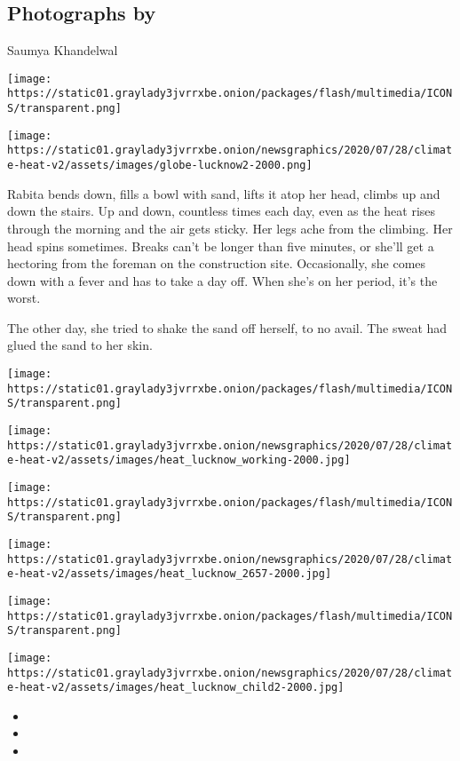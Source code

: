 \hypertarget{photographs-by-4}{%
\subsection{Photographs by}\label{photographs-by-4}}

Saumya Khandelwal

\texttt{[image: https://static01.graylady3jvrrxbe.onion/packages/flash/multimedia/ICONS/transparent.png]}

\texttt{[image: https://static01.graylady3jvrrxbe.onion/newsgraphics/2020/07/28/climate-heat-v2/assets/images/globe-lucknow2-2000.png]}

Rabita bends down, fills a bowl with sand, lifts it atop her head,
climbs up and down the stairs. Up and down, countless times each day,
even as the heat rises through the morning and the air gets sticky. Her
legs ache from the climbing. Her head spins sometimes. Breaks can't be
longer than five minutes, or she'll get a hectoring from the foreman on
the construction site. Occasionally, she comes down with a fever and has
to take a day off. When she's on her period, it's the worst.

The other day, she tried to shake the sand off herself, to no avail. The
sweat had glued the sand to her skin.

\texttt{[image: https://static01.graylady3jvrrxbe.onion/packages/flash/multimedia/ICONS/transparent.png]}

\texttt{[image: https://static01.graylady3jvrrxbe.onion/newsgraphics/2020/07/28/climate-heat-v2/assets/images/heat\_lucknow\_working-2000.jpg]}

\texttt{[image: https://static01.graylady3jvrrxbe.onion/packages/flash/multimedia/ICONS/transparent.png]}

\texttt{[image: https://static01.graylady3jvrrxbe.onion/newsgraphics/2020/07/28/climate-heat-v2/assets/images/heat\_lucknow\_2657-2000.jpg]}

\texttt{[image: https://static01.graylady3jvrrxbe.onion/packages/flash/multimedia/ICONS/transparent.png]}

\texttt{[image: https://static01.graylady3jvrrxbe.onion/newsgraphics/2020/07/28/climate-heat-v2/assets/images/heat\_lucknow\_child2-2000.jpg]}

\begin{itemize}
\item
\item
\item
\end{itemize}

